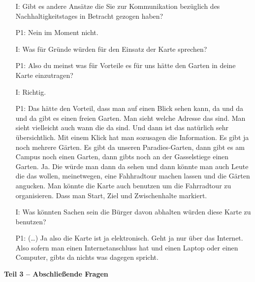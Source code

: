 \begin{itemize}
	\item[I:] Gibt es andere Ans{\"a}tze die Sie zur Kommunikation bez{\"u}glich des Nachhaltigkeitstages in Betracht gezogen haben?
	\item[P1:] Nein im Moment nicht.
	\item[I:] Was f{\"u}r Gr{\"u}nde w{\"u}rden f{\"u}r den Einsatz der Karte sprechen? 
    \item[P1:] Also du meinst was f{\"u}r Vorteile es f{\"u}r uns h{\"a}tte den Garten in deine Karte einzutragen?
    \item[I:] Richtig.
	\item[P1:] Das h{\"a}tte den Vorteil, dass man auf einen Blick sehen kann, da und da und da gibt es einen freien Garten. Man sieht welche Adresse das sind. Man sieht vielleicht auch wann die da sind. Und dann ist das nat{\"u}rlich sehr {\"u}bersichtlich. Mit einem Klick hat man sozusagen die Information. Es gibt ja noch mehrere G{\"a}rten. Es gibt da unseren Paradies-Garten, dann gibt es am Campus noch einen Garten, dann gibts noch an der Gasselstiege einen Garten. Ja. Die w{\"u}rde man dann da sehen und dann k{\"o}nnte man auch Leute die das wollen, meinetwegen, eine Fahhradtour machen lassen und die G{\"a}rten angucken. Man k{\"o}nnte die  Karte auch benutzen um die Fahrradtour zu organisieren. Dass man Start, Ziel und Zwischenhalte markiert.
	\item[I:] Was k{\"o}nnten Sachen sein die B{\"u}rger davon abhalten w{\"u}rden diese Karte zu benutzen?
	\item[P1:] (\dots) Ja also die Karte ist ja elektronisch. Geht ja nur {\"u}ber das Internet. Also sofern man einen Internetanschluss hat und einen Laptop oder einen Computer, gibts da nichts was dagegen spricht.
\end{itemize}
\textbf{Teil 3 -- Abschlie{\ss}ende Fragen}
